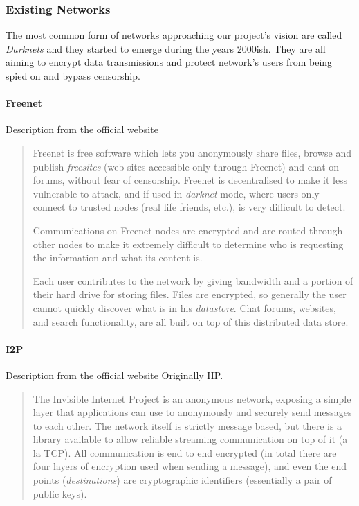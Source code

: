 
\subsubsection{Existing Networks}
The most common form of networks approaching our project's vision are called \textit{Darknets}\cite{Biddle2003TheProtection} and they started to emerge during the years 2000ish\cite{Delmer2009LemergenceI2p}. They are all aiming to encrypt data transmissions and protect network's users from being spied on and bypass censorship.

\paragraph{Freenet\cite{Clarke1999ASystem, Clarke2001Freenet:System}}
Description from the official website \cite{FreenetFreenetProject}
\blockquote{Freenet is free software which lets you anonymously share files, browse and publish \textit{freesites} (web sites accessible only through Freenet) and chat on forums, without fear of censorship. Freenet is decentralised to make it less vulnerable to attack, and if used in \textit{darknet} mode, where users only connect to trusted nodes (real life friends, etc.), is very difficult to detect.

Communications on Freenet nodes are encrypted and are routed through other nodes to make it extremely difficult to determine who is requesting the information and what its content is.

Each user contributes to the network by giving bandwidth and a portion of their hard drive for storing files. Files are encrypted, so generally the user cannot quickly discover what is in his \textit{datastore}. Chat forums, websites, and search functionality, are all built on top of this distributed data store.}

\paragraph{I2P\cite{Foodists2003TheInternet}}
Description from the official website \cite{I2PTheProject}
Originally IIP\cite{IIP2003InvisibleProject}. \blockquote{The Invisible Internet Project is an anonymous network, exposing a simple layer that applications can use to anonymously and securely send messages to each other. The network itself is strictly message based, but there is a library available to allow reliable streaming communication on top of it (a la TCP). All communication is end to end encrypted (in total there are four layers of encryption used when sending a message), and even the end points (\textit{destinations}) are cryptographic identifiers (essentially a pair of public keys).}

